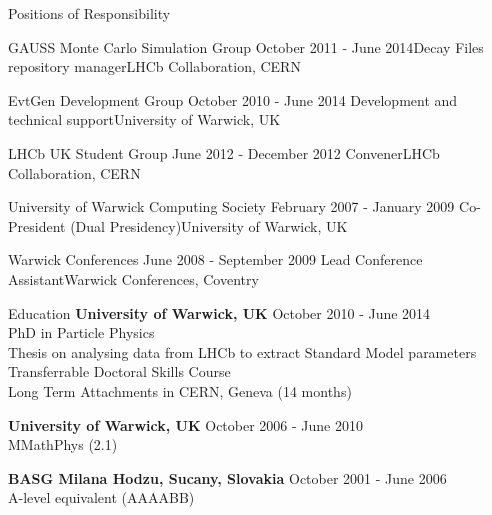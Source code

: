 \documentclass{format/resume} %
\begin{document}
\begin{rSection}{Positions of Responsibility}
  \begin{rSubsection}{GAUSS Monte Carlo Simulation Group}{ October 2011 - June 2014}{Decay Files repository manager}{LHCb Collaboration, CERN}
    \item
  \end{rSubsection}

  \begin{rSubsection}{EvtGen Development Group}{ October 2010 - June 2014 }{Development and technical support}{University of Warwick, UK}
    \item
  \end{rSubsection}

  \begin{rSubsection}{LHCb UK Student Group}{ June 2012 - December 2012 }{Convener}{LHCb Collaboration, CERN}
    \item
  \end{rSubsection}

  \begin{rSubsection}{University of Warwick Computing Society}{ February 2007 - January 2009 }{Co-President (Dual Presidency)}{University of Warwick, UK}
   \item
  \end{rSubsection}

  \begin{rSubsection}{Warwick Conferences}{ June 2008 - September 2009}{ Lead Conference Assistant}{Warwick Conferences, Coventry}
   \item
  \end{rSubsection}

\end{rSection}


\begin{rSection}{Education}
  {\bf University of Warwick, UK} \hfill {October 2010 - June 2014} \\
  PhD in Particle Physics \\
  Thesis on analysing data from LHCb to extract Standard Model parameters\\
  Transferrable Doctoral Skills Course \\
  Long Term Attachments in CERN, Geneva (14 months)

  {\bf University of Warwick, UK} \hfill {October 2006 - June 2010} \\
  MMathPhys (2.1)
  
  {\bf BASG Milana Hodzu, Sucany, Slovakia} \hfill {October 2001 - June 2006} \\
  A-level equivalent (AAAABB)
\end{rSection}
\end{document}
